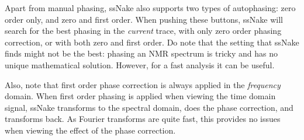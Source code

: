 \documentclass[11pt,a4paper]{article}
\begin{document}
Apart from manual phasing, ssNake also supports two types of autophasing: zero order only, and zero and first order. When pushing these buttons, ssNake will search for the best phasing in the \textit{current} trace, with only zero order phasing correction, or with both zero and first order. Do note that the setting that ssNake finds might not be the best: phasing an NMR spectrum is tricky and has no unique mathematical solution.
However, for a fast analysis it can be useful.

Also, note that first order phase correction is always applied in the \textit{frequency} domain. When first order phasing is applied when viewing the time domain signal, ssNake transforms to the spectral domain, does the phase correction, and transforms back. As Fourier transforms are quite fast, this provides no issues when viewing the effect of the phase correction.


\end{document}
